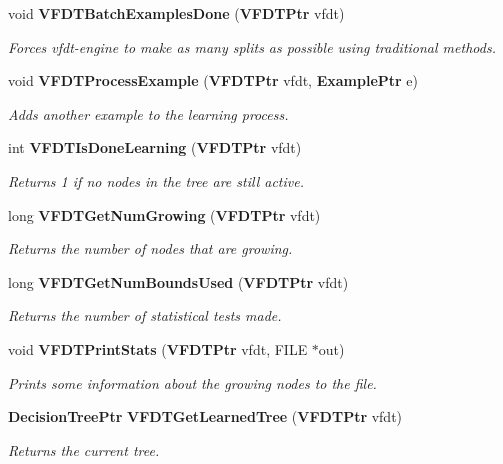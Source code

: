 \begin{CompactItemize}
void {\bf VFDTBatch\-Examples\-Done} ({\bf VFDTPtr} vfdt)
\begin{CompactList}\small\item\em Forces vfdt-engine to make as many splits as possible using traditional methods. \item\end{CompactList}\item 
void {\bf VFDTProcess\-Example} ({\bf VFDTPtr} vfdt, {\bf Example\-Ptr} e)
\begin{CompactList}\small\item\em Adds another example to the learning process. \item\end{CompactList}\item 
int {\bf VFDTIs\-Done\-Learning} ({\bf VFDTPtr} vfdt)
\begin{CompactList}\small\item\em Returns 1 if no nodes in the tree are still active. \item\end{CompactList}\item 
long {\bf VFDTGet\-Num\-Growing} ({\bf VFDTPtr} vfdt)
\begin{CompactList}\small\item\em Returns the number of nodes that are growing. \item\end{CompactList}\item 
long {\bf VFDTGet\-Num\-Bounds\-Used} ({\bf VFDTPtr} vfdt)
\begin{CompactList}\small\item\em Returns the number of statistical tests made. \item\end{CompactList}\item 
void {\bf VFDTPrint\-Stats} ({\bf VFDTPtr} vfdt, FILE $\ast$out)
\begin{CompactList}\small\item\em Prints some information about the growing nodes to the file. \item\end{CompactList}\item 
{\bf Decision\-Tree\-Ptr} {\bf VFDTGet\-Learned\-Tree} ({\bf VFDTPtr} vfdt)
\begin{CompactList}\small\item\em Returns the current tree. \item\end{CompactList}\end{CompactItemize}


